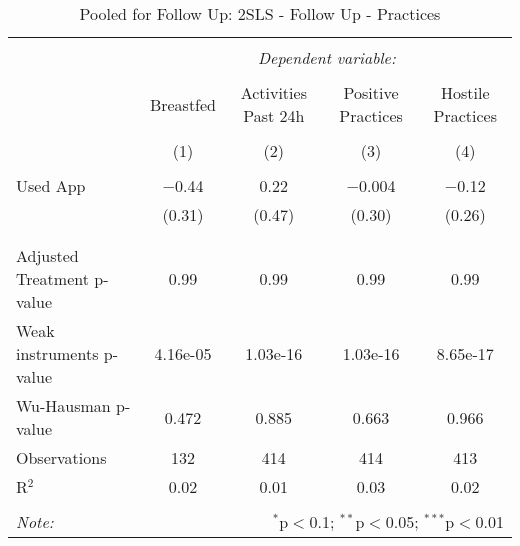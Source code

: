 
\begin{table}[!htbp] \centering 
  \caption{Pooled for Follow Up: 2SLS - Follow Up - Practices} 
  \label{tbl:Pooled for Follow Up: 2SLS - Follow Up - Practices} 
\begin{tabular}{@{\extracolsep{5pt}}lcccc} 
\\[-1.8ex]\hline 
\hline \\[-1.8ex] 
 & \multicolumn{4}{c}{\textit{Dependent variable:}} \\ 
\cline{2-5} 
\\[-1.8ex] & Breastfed & Activities Past 24h & Positive Practices & Hostile Practices \\ 
\\[-1.8ex] & (1) & (2) & (3) & (4)\\ 
\hline \\[-1.8ex] 
 Used App & $-$0.44 & 0.22 & $-$0.004 & $-$0.12 \\ 
  & (0.31) & (0.47) & (0.30) & (0.26) \\ 
  & & & & \\ 
\hline \\[-1.8ex] 
Adjusted Treatment p-value & 0.99 & 0.99 & 0.99 & 0.99 \\ 
Weak instruments p-value & 4.16e-05 & 1.03e-16 & 1.03e-16 & 8.65e-17 \\ 
Wu-Hausman p-value & 0.472 & 0.885 & 0.663 & 0.966 \\ 
Observations & 132 & 414 & 414 & 413 \\ 
R$^{2}$ & 0.02 & 0.01 & 0.03 & 0.02 \\ 
\hline 
\hline \\[-1.8ex] 
\textit{Note:}  & \multicolumn{4}{r}{$^{*}$p$<$0.1; $^{**}$p$<$0.05; $^{***}$p$<$0.01} \\ 
\end{tabular} 
\end{table} 
